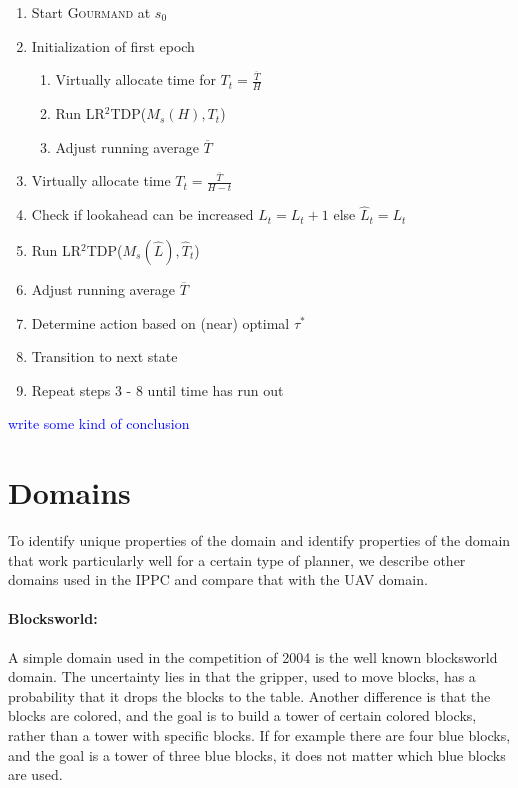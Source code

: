 \documentclass[runningheads,a4paper]{llncs}
\newcommand\todo[1]{\textcolor{blue}{#1}}
\begin{document}
\begin{enumerate}
	\item Start \textsc{Gourmand} at $s_0$
	\item Initialization of first epoch
	\begin{enumerate}
		\item Virtually allocate time for  $T_t = \frac{\overline{T}}{H}$
		\item Run LR$^2$TDP($M_s(H), T_t$)
		\item Adjust running average $\overline{T}$
	\end{enumerate}
	\item Virtually allocate time  $T_t = \frac{\overline{T}}{H - t}$
	\item Check if lookahead can be increased $\widehat{L}_t = L_t + 1$ else $\widehat{L}_t = L_t $
	\item Run LR$^2$TDP($M_s(\widehat{L}), \widehat{T}_t$)
	\item Adjust running average $\overline{T}$
	\item Determine action based on (near) optimal $\tau^*$
	\item Transition to next state
	\item Repeat steps 3 - 8 until time has run out
\end{enumerate}

\todo{write some kind of conclusion}



\section{Domains}
\label{sec:domains}

To identify unique properties of the domain and identify properties of the
domain that work particularly well for a certain type of planner, we describe
other domains used in the IPPC and compare that with the UAV domain.

\paragraph{Blocksworld:}
A simple domain used in the competition of 2004 is the well known blocksworld
domain. The uncertainty lies in that the gripper, used to move blocks, has a
probability that it drops the blocks to the table. Another difference is that
the blocks are colored, and the goal is to build a tower of certain colored
blocks, rather than a tower with specific blocks. If for example there are
four blue blocks, and the goal is a tower of three blue blocks, it does not
matter which blue blocks are used.
\end{document}
